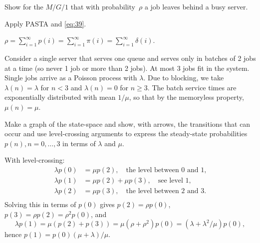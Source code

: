 \documentclass[stochastic-or.tex]{subfiles}
\begin{document}
\begin{exercise}\label{ex:28}
Show for the $M/G/1$  that  with probability~$\rho$ a job leaves behind a busy server.
\begin{hint}
 Apply PASTA and \cref{eq:39}.
\end{hint}
\begin{solution}
$\rho = \sum_{i=1}^\infty p(i) = \sum_{i=1}^\infty \pi(i) = \sum_{i=1}^\infty \delta(i)$.
\end{solution}
\end{exercise}


\begin{exercise}\label{ex:67}
Consider a single server that serves one queue and serves only in batches of 2 jobs at a time (so never 1 job or more than 2 jobs).
At most 3 jobs fit in the system.
Single jobs arrive as a Poisson process with $\lambda$.
Due to blocking, we take $\lambda(n) = \lambda$ for $n<3$ and $\lambda(n)=0$ for $n\geq 3$.
The batch service times are exponentially distributed with mean $1/\mu$, so that by the memoryless property, $\mu(n) = \mu$.

Make a graph of the state-space and show, with arrows, the transitions that can occur and  use level-crossing arguments to express the steady-state probabilities $p(n), n=0,\ldots, 3$ in terms of $\lambda$ and $\mu$.
\begin{solution}


With level-crossing:
 \begin{align*}
 \lambda p(0) &= \mu p(2), \quad\text{the level between 0 and 1,}\\
 \lambda p(1) &= \mu p(2) +\mu p(3), \quad\text{see level 1,}\\
 \lambda p(2) &= \mu p(3), \quad\text{the level between 2 and 3.}\\
 \end{align*}
 Solving this in terms of $p(0)$ gives $p(2) = \rho p(0)$, $p(3) = \rho p(2) = \rho^2p(0)$, and
 \begin{equation*}
 \lambda p(1) = \mu(p(2) + p(3)) = \mu (\rho + \rho^2) p(0) = (\lambda + \lambda^2/\mu) p(0),
 \end{equation*}
hence $p(1) = p(0)(\mu + \lambda)/\mu$.
\end{solution}
\end{exercise}
\end{document}
